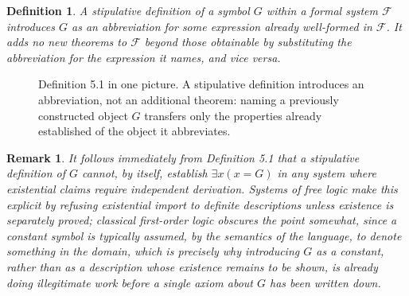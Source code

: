 \documentclass[11pt]{book}
\newtheorem{definition}[theorem]{Definition}
\newtheorem{remark}[theorem]{Remark}
\begin{document}
\begin{definition}
A \emph{stipulative definition} of a symbol $G$ within a formal system $\mathcal F$ introduces $G$ as an abbreviation for some expression already well-formed in $\mathcal F$. It adds no new theorems to $\mathcal F$ beyond those obtainable by substituting the abbreviation for the expression it names, and vice versa.
\end{definition}

\begin{figure}[htb]
\centering
{}
\caption{Definition 5.1 in one picture. A stipulative definition introduces an abbreviation, not an additional theorem: naming a previously constructed object $G$ transfers only the properties already established of the object it abbreviates.}
\label{fig:naming-not-explaining}
\end{figure}

\begin{remark}
It follows immediately from Definition 5.1 that a stipulative definition of $G$ cannot, by itself, establish $\exists x (x = G)$ in any system where existential claims require independent derivation. Systems of free logic make this explicit by refusing existential import to definite descriptions unless existence is separately proved; classical first-order logic obscures the point somewhat, since a constant symbol is typically assumed, by the semantics of the language, to denote something in the domain, which is precisely why introducing $G$ as a constant, rather than as a description whose existence remains to be shown, is already doing illegitimate work before a single axiom about $G$ has been written down.
\end{remark}
\end{document}

